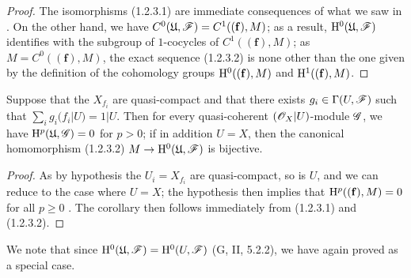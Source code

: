 \begin{proof}
\label{proof-3.1.2.3}
The isomorphisms (1.2.3.1) are immediate consequences of what we saw in .
On the other hand, we have $C^0(\mathfrak{U},\mathscr{F})=C^1((\mathbf{f}),M)$; as a result, $\mathrm{H}^0(\mathfrak{U},\mathscr{F})$ identifies with the subgroup of $1$-cocycles of $C^1((\mathbf{f}),M)$; as $M=C^0((\mathbf{f}),M)$, the exact sequence (1.2.3.2) is none other than the one given by the definition of the cohomology groups $\mathrm{H}^0((\mathbf{f}),M)$ and $\mathrm{H}^1((\mathbf{f}),M)$.
\end{proof}

\begin{corollary}[1.2.4]
\label{3.1.2.4}
Suppose that the $X_{f_i}$ are quasi-compact and that there exists $g_i\in\Gamma(U,\mathscr{F})$ such that $\sum_i g_i(f_i|U)=1|U$.
Then for every quasi-coherent $(\mathscr{O}_X|U)$-module $\mathscr{G}$, we have $\mathrm{H}^p(\mathfrak{U},\mathscr{G})=0$ for $p>0$; if in addition $U=X$, then the canonical homomorphism (1.2.3.2) $M\to\HH^0(\mathfrak{U},\sh{F})$ is bijective.
\end{corollary}

\begin{proof}
\label{proof-3.1.2.4}
As by hypothesis the $U_i=X_{f_i}$ are quasi-compact, so is $U$, and we can reduce to the case where $U=X$; the hypothesis then implies that $\mathrm{H}^p((\mathbf{f}),M)=0$ for all $p\geq 0$ .
The corollary then follows immediately from (1.2.3.1) and (1.2.3.2).
\end{proof}

We note that since $\mathrm{H}^0(\mathfrak{U},\mathscr{F})=\mathrm{H}^0(U,\mathscr{F})$ (G, II, 5.2.2), we have again proved  as a special case.

